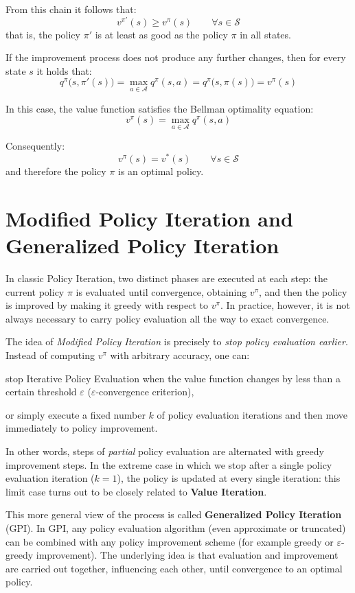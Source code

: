 From this chain it follows that:
\[
v^{\pi'}(s) \ge v^\pi(s) \qquad \forall s \in \mathcal{S}
\]
that is, the policy $\pi'$ is at least as good as the policy $\pi$ in all states.

If the improvement process does not produce any further changes, then for every state $s$ it holds that:
\[
q^\pi\bigl(s,\pi'(s)\bigr)
=
\max_{a \in \mathcal{A}} q^\pi(s,a)
=
q^\pi\bigl(s,\pi(s)\bigr)
=
v^\pi(s)
\]

In this case, the value function satisfies the Bellman optimality equation:
\[
v^\pi(s) = \max_{a \in \mathcal{A}} q^\pi(s,a)
\]

Consequently:
\[
v^\pi(s) = v^*(s) \qquad \forall s \in \mathcal{S}
\]
and therefore the policy $\pi$ is an optimal policy.

\section{Modified Policy Iteration and Generalized Policy Iteration}

In classic Policy Iteration, two distinct phases are executed at each step: the current policy $\pi$ is evaluated until convergence, obtaining $v^\pi$, and then the policy is improved by making it greedy with respect to $v^\pi$. In practice, however, it is not always necessary to carry policy evaluation all the way to exact convergence.

The idea of \emph{Modified Policy Iteration} is precisely to \emph{stop policy evaluation earlier}. Instead of computing $v^\pi$ with arbitrary accuracy, one can:
\begin{compactitemize}
    \item stop Iterative Policy Evaluation when the value function changes by less than a certain threshold $\varepsilon$ ($\varepsilon$-convergence criterion),
    \item or simply execute a fixed number $k$ of policy evaluation iterations and then move immediately to policy improvement.
\end{compactitemize}

In other words, steps of \emph{partial} policy evaluation are alternated with greedy improvement steps. In the extreme case in which we stop after a single policy evaluation iteration ($k = 1$), the policy is updated at every single iteration: this limit case turns out to be closely related to \textbf{Value Iteration}.

This more general view of the process is called \textbf{Generalized Policy Iteration} (GPI). In GPI, any policy evaluation algorithm (even approximate or truncated) can be combined with any policy improvement scheme (for example greedy or $\varepsilon$-greedy improvement). The underlying idea is that evaluation and improvement are carried out together, influencing each other, until convergence to an optimal policy.


